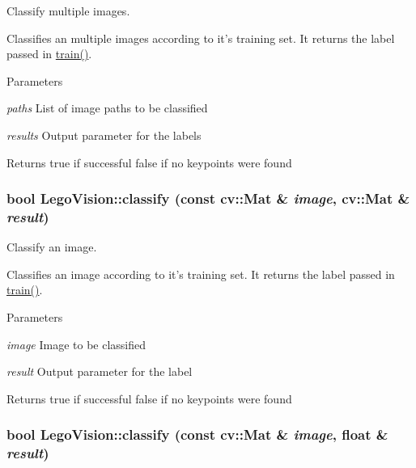 Classify multiple images. 

Classifies an multiple images according to it's training set. It returns the label passed in \hyperlink{classLegoVision_a8ada425fb6a2c65a4de8e81bb1fc4a72}{train()}.


\begin{DoxyParams}{Parameters}
\item[{\em paths}]List of image paths to be classified \item[{\em results}]Output parameter for the labels \end{DoxyParams}
\begin{DoxyReturn}{Returns}
true if successful false if no keypoints were found 
\end{DoxyReturn}
\hypertarget{classLegoVision_a57197915f439503ba602ef0ad0e03e66}{
\subsubsection[{classify}]{\setlength{\rightskip}{0pt plus 5cm}bool LegoVision::classify (const cv::Mat \& {\em image}, \/  cv::Mat \& {\em result})}}
\label{classLegoVision_a57197915f439503ba602ef0ad0e03e66}


Classify an image. 

Classifies an image according to it's training set. It returns the label passed in \hyperlink{classLegoVision_a8ada425fb6a2c65a4de8e81bb1fc4a72}{train()}.


\begin{DoxyParams}{Parameters}
\item[{\em image}]Image to be classified \item[{\em result}]Output parameter for the label \end{DoxyParams}
\begin{DoxyReturn}{Returns}
true if successful false if no keypoints were found 
\end{DoxyReturn}
\hypertarget{classLegoVision_aa8ca2dcfc88262604a0afca920fcccf8}{
\subsubsection[{classify}]{\setlength{\rightskip}{0pt plus 5cm}bool LegoVision::classify (const cv::Mat \& {\em image}, \/  float \& {\em result})}}
\label{classLegoVision_aa8ca2dcfc88262604a0afca920fcccf8}


